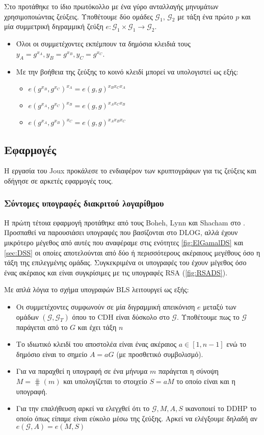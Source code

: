 Στο \cite{Joux00} προτάθηκε το ίδιο πρωτόκολλο με ένα γύρο ανταλλαγής μηνυμάτων χρησιμοποιώντας ζεύξεις. 
Υποθέτουμε δύο ομάδες  $\mathcal G_1$, $\mathcal G_2$ με τάξη ένα πρώτο $p$ και μία συμμετρική διγραμμική ζεύξη $e : \mathcal G_1 \times \mathcal G_1 \rightarrow \mathcal G_2$. 
\begin{itemize}
\item Όλοι οι συμμετέχοντες εκπέμπουν τα δημόσια κλειδιά τους $y_A=g^{x_A},y_B=g^{x_B},y_C=g^{x_C}$.
\item Με την βοήθεια της ζεύξης το κοινό κλειδί μπορεί να υπολογιστεί ως εξής:
\begin{itemize}
\item $e(g^{x_B},g^{x_C})^{x_A} = e(g,g)^{x_Bx_Cx_A}$
\item $e(g^{x_A},g^{x_C})^{x_B} = e(g,g)^{x_Ax_Cx_B}$
\item $e(g^{x_A},g^{x_B})^{x_C} = e(g,g)^{x_Ax_Bx_C}$
\end{itemize}
\end{itemize}

\subsection{Εφαρμογές}

Η εργασία του Joux προκάλεσε το ενδιαφέρον των κρυπτογράφων για τις ζεύξεις και οδήγησε σε αρκετές εφαρμογές τους. 

\subsubsection{Σύντομες υπογραφές διακριτού λογαρίθμου}
Η πρώτη τέτοια εφαρμογή προτάθηκε από τους Boheh, Lynn και Shacham  στο \cite{BLS04}. Προσπαθεί να παρουσιάσει υπογραφές που βασίζονται στο \gls{DLOG}, αλλά έχουν μικρότερο μέγεθος από αυτές που αναφέραμε στις ενότητες \ref{fig:ElGamalDS} και \ref{sec:DSS} οι οποίες αποτελούνται από δύο ή περισσότερους ακέραιους μεγέθους όσο η τάξη της επιλεγμένης ομάδας. Συγκεκριμένα οι υπογραφές του \cite{BLS04} έχουν μέγεθος όσο ένας ακέραιος και είναι συγκρίσιμες με τις υπογραφές \gls{RSA} (\ref{fig:RSADS}). 

Με απλά λόγια το σχήμα υπογραφών BLS λειτουργεί ως εξής:
\begin{itemize}
\item Οι συμμετέχοντες συμφωνούν σε μία διγραμμική απεικόνιση $e$ μεταξύ των ομάδων $(\mathcal G,\mathcal G_T)$ όπου το \gls{CDH} είναι δύσκολο στο $\mathcal G$. Υποθέτουμε πως το $\mathcal G$ παράγεται από το $G$ και έχει τάξη $n$
\item Το ιδιωτικό κλειδί του αποστολέα είναι ένας ακέραιος $a \in [1,n-1]$ ενώ το δημόσιο είναι το σημείο $A = aG$ (με προσθετικό  συμβολισμό).
\item Για να παραχθεί η υπογραφή σε ένα μήνυμα $m$ παράγεται η σύνοψη $M=\hash(m)$ και υπολογίζεται το στοιχείο $S=aM$ το οποίο είναι και η υπογραφή.
\item Για την επαλήθευση αρκεί να ελεγχθεί ότι το $\mathcal G,M,A,S$ ικανοποιεί το DDHP το οποίο όπως είπαμε είναι εύκολο μέσω της ζεύξης. Αρκεί να ελέγξουμε δηλαδή αν $e(\mathcal G,A)=e(M,S)$
\end{itemize}

